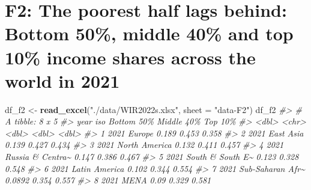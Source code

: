 \documentclass[
  xelatex, ja=standard]{bxjsbook}
\newenvironment{Shaded}{\begin{snugshade}}{\end{snugshade}}
\newcommand{\AttributeTok}[1]{\textcolor[rgb]{0.13,0.29,0.53}{#1}}
\newcommand{\CommentTok}[1]{\textcolor[rgb]{0.56,0.35,0.01}{\textit{#1}}}
\newcommand{\FunctionTok}[1]{\textcolor[rgb]{0.13,0.29,0.53}{\textbf{#1}}}
\newcommand{\NormalTok}[1]{#1}
\newcommand{\OtherTok}[1]{\textcolor[rgb]{0.56,0.35,0.01}{#1}}
\newcommand{\StringTok}[1]{\textcolor[rgb]{0.31,0.60,0.02}{#1}}
\theoremstyle{definition}
\theoremstyle{definition}
\theoremstyle{definition}
\theoremstyle{definition}
\theoremstyle{remark}
\begin{document}
\hypertarget{f2-the-poorest-half-lags-behind-bottom-50-middle-40-and-top-10-income-shares-across-the-world-in-2021}{%
\section{F2: The poorest half lags behind: Bottom 50\%, middle 40\% and top 10\% income shares across the world in 2021}\label{f2-the-poorest-half-lags-behind-bottom-50-middle-40-and-top-10-income-shares-across-the-world-in-2021}}

\begin{Shaded}
\begin{Highlighting}[]
\NormalTok{df\_f2 }\OtherTok{\textless{}{-}} \FunctionTok{read\_excel}\NormalTok{(}\StringTok{"./data/WIR2022s.xlsx"}\NormalTok{, }\AttributeTok{sheet =} \StringTok{"data{-}F2"}\NormalTok{)}
\NormalTok{df\_f2}
\CommentTok{\#\textgreater{} \# A tibble: 8 x 5}
\CommentTok{\#\textgreater{}    year iso              \textasciigrave{}Bottom 50\%\textasciigrave{} \textasciigrave{}Middle 40\%\textasciigrave{} \textasciigrave{}Top 10\%\textasciigrave{}}
\CommentTok{\#\textgreater{}   \textless{}dbl\textgreater{} \textless{}chr\textgreater{}                   \textless{}dbl\textgreater{}        \textless{}dbl\textgreater{}     \textless{}dbl\textgreater{}}
\CommentTok{\#\textgreater{} 1  2021 Europe                 0.189         0.453     0.358}
\CommentTok{\#\textgreater{} 2  2021 East Asia              0.139         0.427     0.434}
\CommentTok{\#\textgreater{} 3  2021 North America          0.132         0.411     0.457}
\CommentTok{\#\textgreater{} 4  2021 Russia \& Centra\textasciitilde{}       0.147         0.386     0.467}
\CommentTok{\#\textgreater{} 5  2021 South \& South E\textasciitilde{}       0.123         0.328     0.548}
\CommentTok{\#\textgreater{} 6  2021 Latin America          0.102         0.344     0.554}
\CommentTok{\#\textgreater{} 7  2021 Sub{-}Saharan Afr\textasciitilde{}       0.0892        0.354     0.557}
\CommentTok{\#\textgreater{} 8  2021 MENA                   0.09          0.329     0.581}
\end{Highlighting}
\end{Shaded}
\end{document}
